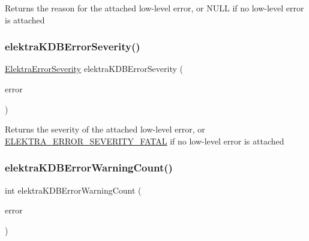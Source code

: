 \begin{DoxyReturn}{Returns}
the reason for the attached low-\/level error, or N\+U\+LL if no low-\/level error is attached 
\end{DoxyReturn}
\mbox{\label{group__highlevel_gab736cb28c37e4bd643e4aa965a210ca5}} 
\subsubsection{\texorpdfstring{elektra\+K\+D\+B\+Error\+Severity()}{elektraKDBErrorSeverity()}}
{\footnotesize\ttfamily \hyperlink{kdbprivate_8h_a12c616a1033bddd43fab10d0f777daad}{Elektra\+Error\+Severity} elektra\+K\+D\+B\+Error\+Severity (\begin{DoxyParamCaption}\item[{const Elektra\+Error $\ast$}]{error }\end{DoxyParamCaption})}

\begin{DoxyReturn}{Returns}
the severity of the attached low-\/level error, or \hyperlink{kdbprivate_8h_a12c616a1033bddd43fab10d0f777daada81600099dddabd7cff0b64d7a576c8af}{E\+L\+E\+K\+T\+R\+A\+\_\+\+E\+R\+R\+O\+R\+\_\+\+S\+E\+V\+E\+R\+I\+T\+Y\+\_\+\+F\+A\+T\+AL} if no low-\/level error is attached 
\end{DoxyReturn}
\mbox{\label{group__highlevel_ga70c1a3132315022223f660449b147ef3}} 
\subsubsection{\texorpdfstring{elektra\+K\+D\+B\+Error\+Warning\+Count()}{elektraKDBErrorWarningCount()}}
{\footnotesize\ttfamily int elektra\+K\+D\+B\+Error\+Warning\+Count (\begin{DoxyParamCaption}\item[{const Elektra\+Error $\ast$}]{error }\end{DoxyParamCaption})}

